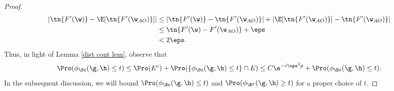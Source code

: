 \begin{proof}
\begin{align}
|\tn{F'(\w)}-\E[\tn{F'(\w_{AO})}]|&\leq|\tn{F'(\w)}-\tn{F'(\w_{AO})}|+|\E[\tn{F'(\w_{AO})}]-\tn{F'(\w_{AO})}|\\
&\leq\tn{F'(\w)-F'(\w_{AO})}+\eps\\
&< 2\eps.
\end{align}
Thus, in light of Lemma \ref{dist cont lem}, observe that 
\[
\Pro(\phi_\Sc(\g,\h)\leq t)\leq \Pro(E^c)+\Pro(\{\phi_{\Sc}(\g,\h)\leq t\}\cap E)\leq C\e^{-c\eps^2p}+\Pro(\phi_{\Bc}(\g,\h)\leq t).
\]
In the subsequent discussion, we will bound $\Pro(\phi_{\Bc}(\g,\h)\leq t)$ and $\Pro(\phi_{\R^p}(\g,\h)\geq t)$ for a proper choice of $t$.





\end{proof}
